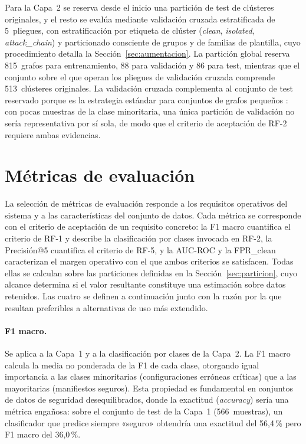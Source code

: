 Para la Capa~2 se reserva desde el inicio una partición de test de clústeres
originales, y el resto se evalúa mediante validación cruzada estratificada de
5~pliegues, con estratificación por etiqueta de clúster (\textit{clean},
\textit{isolated}, \textit{attack\_chain}) y particionado consciente de grupos y
de familias de plantilla, cuyo procedimiento detalla la
Sección~\ref{sec:aumentacion}. La partición global reserva 815~grafos para
entrenamiento, 88 para validación y 86 para test, mientras que el conjunto sobre
el que operan los pliegues de validación cruzada comprende 513~clústeres
originales. La validación cruzada complementa al conjunto de test reservado porque
es la estrategia estándar para conjuntos de grafos pequeños \citep{Hamilton2020}:
con pocas muestras de la clase minoritaria, una única partición de validación no
sería representativa por sí sola, de modo que el criterio de aceptación de RF-2
requiere ambas evidencias.

\section{Métricas de evaluación}
\label{sec:metricas}

La selección de métricas de evaluación responde a los requisitos operativos del
sistema y a las características del conjunto de datos. Cada métrica se corresponde con el
criterio de aceptación de un requisito concreto: la F1 macro cuantifica el
criterio de RF-1 y describe la clasificación por clases invocada en RF-2, la
Precisión@5 cuantifica el criterio de RF-5, y la \ac{AUC}-\acs{ROC} y la
\ac{FPR}\_clean caracterizan el margen operativo con el que ambos criterios se
satisfacen. Todas ellas se calculan sobre las particiones definidas en la
Sección~\ref{sec:particion}, cuyo alcance determina si el valor resultante
constituye una estimación sobre datos retenidos. Las cuatro se definen a
continuación junto con la razón por la que resultan preferibles a alternativas de
uso más extendido.

\paragraph{F1 macro.} Se aplica a la Capa~1 y a la clasificación por clases de la
Capa~2. La F1 macro calcula la media no ponderada de la F1 de cada clase, otorgando igual
importancia a las clases minoritarias (configuraciones erróneas críticas) que a las
mayoritarias (manifiestos seguros). Esta propiedad es fundamental en conjuntos de datos de
seguridad desequilibrados, donde la exactitud (\textit{accuracy}) sería una métrica
engañosa: sobre el conjunto de test de la Capa~1 (566~muestras), un clasificador
que predice siempre «seguro» obtendría una exactitud del 56,4\,\% pero F1 macro
del 36,0\,\%.

